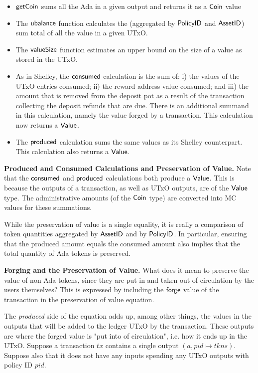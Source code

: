 \begin{itemize}

  \item $\mathsf{getCoin}$ sums all the Ada in a given output and returns it as a
  $\mathsf{Coin}$ value

  \item
    The $\mathsf{ubalance}$ function calculates the (aggregated by $\mathsf{PolicyID}$ and
    $\mathsf{AssetID}$) sum total of all the value in a given UTxO.

  \item
    The $\mathsf{valueSize}$ function estimates an upper bound on the size of a value
    as stored in the UTxO.

  \item As in Shelley, the $\mathsf{consumed}$ calculation is the sum of: i) the values of the
   UTxO entries consumed; ii) the reward address value consumed;
   and iii) the amount that is removed from the deposit pot as a result of
   the transaction collecting the deposit refunds that are due. There is an additional
   summand in this calculation, namely the value forged by a transaction.
   This calculation now returns a $\mathsf{Value}$.

  \item The $\mathsf{produced}$ calculation sums the same values
  as its Shelley counterpart.
  This calculation also returns a $\mathsf{Value}$.
\end{itemize}

\textbf{Produced and Consumed Calculations and Preservation of Value.}
Note that
the $\mathsf{consumed}$ and $\mathsf{produced}$ calculations both produce a $\mathsf{Value}$.
This is because the outputs of a transaction, as well as UTxO outputs,
are of the $\mathsf{Value}$ type. The administrative amounts (of the $\mathsf{Coin}$ type)
are converted into MC values for these summations.

While the preservation of value is a single
equality, it is really a comparison of token quantities aggregated by
$\mathsf{AssetID}$ and by $\mathsf{PolicyID}$. In particular, ensuring that the produced
amount equals the consumed amount also implies that the total quantity of
Ada tokens is preserved.

\textbf{Forging and the Preservation of Value.}
What does it mean to preserve the value of non-Ada tokens, since they
are put in and taken out of circulation by the users themselves?
This is expressed by including the $\mathsf{forge}$ value of the transaction
in the preservation of value equation.

The \textit{produced} side of the equation adds up, among other things, the
values in the
outputs that will be added to the ledger UTxO by the transaction. These outputs are
where the
forged value is "put into of circulation", i.e. how it ends up in the UTxO.
Suppose a transaction $tx$ contains a single output $(a, pid \mapsto tkns)$. Suppose
also that it does not
have any inputs spending any UTxO outputs with policy ID $pid$.

